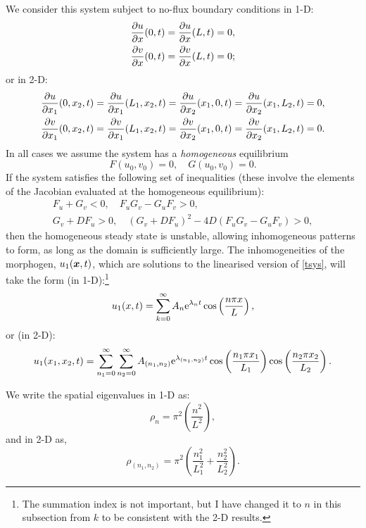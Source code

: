 \documentclass[main.tex]{subfiles}
\begin{document}
We consider this system subject to no-flux boundary conditions in 1-D:
\begin{align}
\pd{u}{x}(0,t) = \pd{u}{x}(L,t) = 0,\\
\pd{v}{x}(0,t) = \pd{v}{x}(L,t) = 0;
\end{align}
or in 2-D:
\begin{align}
\pd{u}{x_1}(0,x_2,t) = \pd{u}{x_1}(L_1,x_2,t) =\pd{u}{x_2}(x_1,0,t)=\pd{u}{x_2}(x_1,L_2,t) = 0,\\
\pd{v}{x_1}(0,x_2,t) = \pd{v}{x_1}(L_1,x_2,t) =\pd{v}{x_2}(x_1,0,t)=\pd{v}{x_2}(x_1,L_2,t) = 0.
\end{align}
In all cases we assume the system has a \emph{homogeneous} equilibrium 
\begin{equation}
F(u_0,v_0) =0,\quad G(u_0,v_0) =0.
\end{equation}
If the system satisfies the following set of inequalities (these involve the elements of the Jacobian evaluated at the homogeneous equilibrium): 
\begin{align}
F_u +G_v <0, \quad F_uG_v  -G_uF_v> 0,\\
\nonumber G_v + DF_u>0,\quad (G_v+ D F_u)^2 - 4 D (F_uG_v  -G_uF_v) >0,
\end{align}
then the homogeneous steady state is unstable, allowing inhomogeneous patterns to form, as long as the domain is sufficiently large. The inhomogeneities of the morphogen, $u_1(\v{x},t)$, which are solutions to the  linearised version of \cref{tsys}, will take the form (in 1-D):\footnote{The summation index is not important, but I have changed it to $n$ in this subsection from $k$ to be consistent with the 2-D results.}
\begin{equation}
u_1(x,t) =\sum_{k=0}^{\infty}A_{n}\mathrm{e}^{\lambda_n t}\cos\left(\frac{n\pi x}{L}\right),
\end{equation} 
or (in 2-D):
\begin{equation}
u_1(x_1,x_2,t) =\sum_{n_1=0}^{\infty}\sum_{n_2=0}^{\infty}A_{(n_1,n_2)}\mathrm{e}^{\lambda_{(n_1,n_2)} t}\cos\left(\frac{n_1 \pi x_1}{L_1}\right)\cos\left(\frac{n_2\pi x_2}{L_2} \right).
\end{equation} 

We write the spatial eigenvalues in 1-D as:
\begin{equation}\label{1-D_eigs}
\rho_n = \pi^2\left(\frac{n^2}{L^2}\right),
\end{equation}
and in 2-D as,
\begin{equation}\label{2-D_eigs}
\rho_{(n_1,n_2)} = \pi^2\left(\frac{n_1^2}{L_1^2} + \frac{n_2^2}{L_2^2}\right).
\end{equation}
\end{document}
